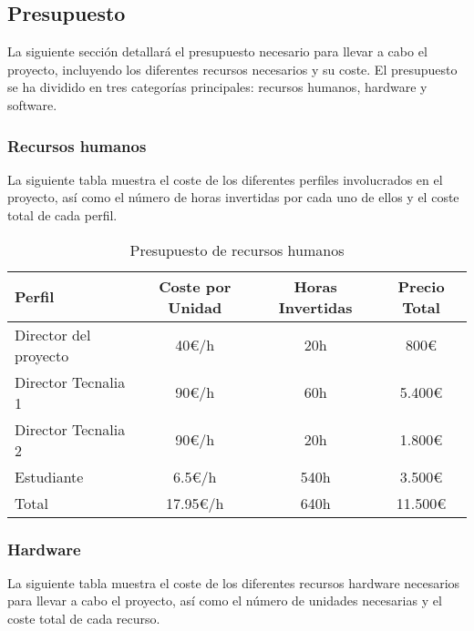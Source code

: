 \subsection{Presupuesto}
La siguiente sección detallará el presupuesto necesario para llevar a cabo el
proyecto, incluyendo los diferentes recursos necesarios y su coste. El
presupuesto se ha dividido en tres categorías principales: recursos humanos,
hardware y software.

\subsubsection{Recursos humanos}
La siguiente tabla muestra el coste de los diferentes perfiles involucrados en
el proyecto, así como el número de horas invertidas por cada uno de ellos y el
coste total de cada perfil.

\begin{table}[ht]
    \centering
    \begin{tabular}[ht]{l|c|c|c}
        \textbf{Perfil}       & \textbf{Coste por Unidad} & \textbf{Horas Invertidas} & \textbf{Precio Total} \\
        \hline
        Director del proyecto & 40\euro/h             & 20h                       & 800\euro              \\
        Director Tecnalia 1   & 90\euro/h             & 60h                       & 5.400\euro            \\
        Director Tecnalia 2   & 90\euro/h             & 20h                       & 1.800\euro            \\
        Estudiante            & 6.5\euro/h            & 540h                      & 3.500\euro            \\
        \hline
        Total                 & 17.95\euro/h           & 640h                      & 11.500\euro           \\
    \end{tabular}
    \caption{Presupuesto de recursos humanos}\label{tab:huma-resources}
\end{table}

\subsubsection{Hardware}
La siguiente tabla muestra el coste de los diferentes recursos hardware
necesarios para llevar a cabo el proyecto, así como el número de unidades
necesarias y el coste total de cada recurso.

